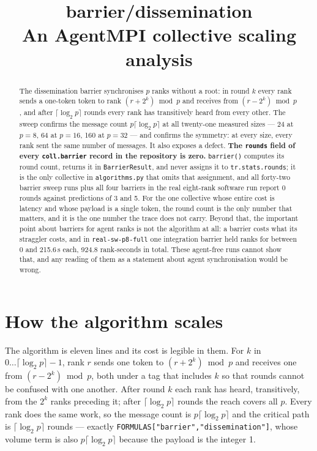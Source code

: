 \documentclass[11pt]{article}
\title{\textbf{barrier/dissemination}\\[2pt]\large An AgentMPI collective scaling analysis}
\author{}
\date{}
\begin{document}
\maketitle

\begin{abstract}
The dissemination barrier synchronises $p$ ranks without a root: in round $k$ every rank sends
a one-token token to rank $(r + 2^k) \bmod p$ and receives from $(r - 2^k) \bmod p$, and after
$\lceil\log_2 p\rceil$ rounds every rank has transitively heard from every other. The sweep
confirms the message count $p\lceil\log_2 p\rceil$ at all twenty-one measured sizes --- 24 at
$p=8$, 64 at $p=16$, 160 at $p=32$ --- and confirms the symmetry: at every size, every rank
sent the same number of messages. It also exposes a defect. \textbf{The \texttt{rounds} field of
every \texttt{coll.barrier} record in the repository is zero.} \texttt{barrier()} computes its
round count, returns it in \texttt{BarrierResult}, and never assigns it to
\texttt{tr.stats.rounds}; it is the only collective in \texttt{algorithms.py} that omits that
assignment, and all forty-two barrier sweep runs plus all four barriers in the real
eight-rank software run report 0 rounds against predictions of 3 and 5. For the one collective
whose entire cost is latency and whose payload is a single token, the round count is the only
number that matters, and it is the one number the trace does not carry. Beyond that, the
important point about barriers for agent ranks is not the algorithm at all: a barrier costs
what its straggler costs, and in \texttt{real-sw-p8-full} one integration barrier held ranks
for between 0 and 215.6\,s each, 924.8 rank-seconds in total. These agent-free runs cannot show
that, and any reading of them as a statement about agent synchronisation would be wrong.
\end{abstract}



\section{How the algorithm scales}

The algorithm is eleven lines and its cost is legible in them. For $k$ in
$0 \ldots \lceil\log_2 p\rceil - 1$, rank $r$ sends one token to $(r + 2^k) \bmod p$ and
receives one from $(r - 2^k) \bmod p$, both under a tag that includes $k$ so that rounds cannot
be confused with one another. After round $k$ each rank has heard, transitively, from the $2^k$
ranks preceding it; after $\lceil\log_2 p\rceil$ rounds the reach covers all $p$. Every rank
does the same work, so the message count is $p\lceil\log_2 p\rceil$ and the critical path is
$\lceil\log_2 p\rceil$ rounds --- exactly
\texttt{FORMULAS["barrier","dissemination"]}, whose volume term is also
$p\lceil\log_2 p\rceil$ because the payload is the integer 1.
\end{document}
